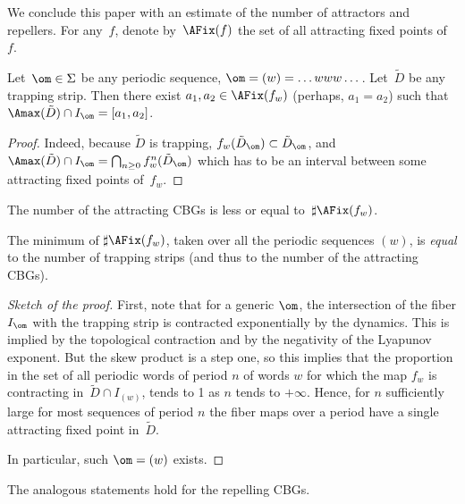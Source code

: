 \documentclass[a4paper,12pt]{amsart}
\begin{document}
We conclude this paper with an estimate of the number of attractors and repellers.
For any~$f$, denote by~$\AFix(f)$ the set of all attracting fixed points of~$f$.
\begin{Prop}    \label{p:att_num}
  Let~$\om \in \Sigma$ be any periodic sequence, $\om = (w) = \dots www \dots$. Let~$\tilde D$ be any trapping strip. Then there exist $a_1, a_2 \in \AFix(f_w)$ (perhaps, $a_1 = a_2$) such that $\Amax(\tilde D) \cap I_\om = [a_1, a_2]$.
\end{Prop}

\begin{proof}
  Indeed, because $\tilde D$ is trapping, $f_w(\tilde D_\om) \subset \tilde D_\om$, and $\Amax (\tilde D) \cap I_\om = \bigcap_{n \ge 0} f_w^n (\tilde D_\om)$ which has to be an interval between some attracting fixed points of~$f_w$.
\end{proof}

\begin{Cor}		\label{c:att_num}
  The number of the attracting CBGs is less or equal to~$\sharp\AFix(f_w)$.
\end{Cor}

\begin{Rem}	\label{r:att_num}
The minimum of $\sharp\AFix (f_w)$, taken over all the periodic sequences $(w)$, is \emph{equal} to the number of trapping strips (and thus to the number of the attracting CBGs).
\end{Rem}

\begin{proof}[Sketch of the proof] First, note that for a generic $\om$, the intersection of the fiber $I_{\om}$ with the trapping strip is contracted exponentially by the dynamics. This is implied by the topological contraction and by the negativity of the Lyapunov exponent. But the skew product is a step one, so this implies that the proportion in the set of all periodic words of period $n$ of words $w$ for which the map $f_w$ is contracting in~$\tilde D \cap I_{(w)}$, tends to 1 as $n$ tends to $+\infty$.
Hence, for $n$ sufficiently large for most sequences of period $n$ the fiber maps over a period have a single attracting fixed point in~$\tilde D$.

In particular, such $\om = (w)$ exists.
\end{proof}




\begin{Rem}
  The analogous statements hold for the repelling CBGs.
\end{Rem} 
\end{document}
